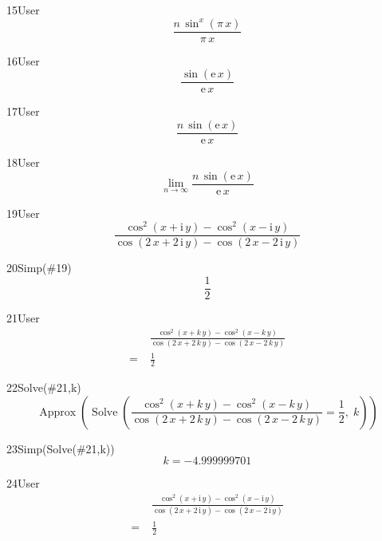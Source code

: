 \begin{espr}{15}{User}{}
\[
\frac{n\, \sin^{x}\!\left(\pi\, x\right)}{\pi\, x}
\]
\end{espr}
\begin{espr}{16}{User}{}
\[
\frac{\sin\!\left(\mathrm{e}\, x\right)}{\mathrm{e}\, x}
\]
\end{espr}
\begin{espr}{17}{User}{}
\[
\frac{n\, \sin\!\left(\mathrm{e}\, x\right)}{\mathrm{e}\, x}
\]
\end{espr}
\begin{espr}{18}{User}{}
\[
\lim_{n \to \infty} \frac{n\, \sin\!\left(\mathrm{e}\, x\right)}{\mathrm{e}\, x}
\]
\end{espr}
\begin{espr}{19}{User}{}
\[
\frac{\cos^{2}\!\left(x + \mathrm{i}\, y\right) - \cos^{2}\!\left(x - \mathrm{i}\, y\right)}{\cos\!\left(2\, x + 2\, \mathrm{i}\, y\right) - \cos\!\left(2\, x - 2\, \mathrm{i}\, y\right)}
\]
\end{espr}
\begin{espr}{20}{Simp(\#19)}{}
\[
\frac{1}{2}
\]
\end{espr}
\begin{espr}{21}{User}{\verificata}
\begin{align*}
& \frac{\cos^{2}\!\left(x + k\, y\right) - \cos^{2}\!\left(x - k\, y\right)}{\cos\!\left(2\, x + 2\, k\, y\right) - \cos\!\left(2\, x - 2\, k\, y\right)} \\
=\;& \frac{1}{2}
\end{align*}
\end{espr}
\begin{espr}{22}{Solve(\#21,k)}{}
\[
\operatorname{Approx}\!\left(\operatorname{Solve}\!\left(\frac{\cos^{2}\!\left(x + k\, y\right) - \cos^{2}\!\left(x - k\, y\right)}{\cos\!\left(2\, x + 2\, k\, y\right) - \cos\!\left(2\, x - 2\, k\, y\right)} = \frac{1}{2},\; k\right)\right)
\]
\end{espr}
\begin{espr}{23}{Simp(Solve(\#21,k))}{}
\[
k = -4.999999701
\]
\end{espr}
\begin{espr}{24}{User}{\verificata}
\begin{align*}
& \frac{\cos^{2}\!\left(x + \mathrm{i}\, y\right) - \cos^{2}\!\left(x - \mathrm{i}\, y\right)}{\cos\!\left(2\, x + 2\, \mathrm{i}\, y\right) - \cos\!\left(2\, x - 2\, \mathrm{i}\, y\right)} \\
=\;& \frac{1}{2}
\end{align*}
\end{espr}

